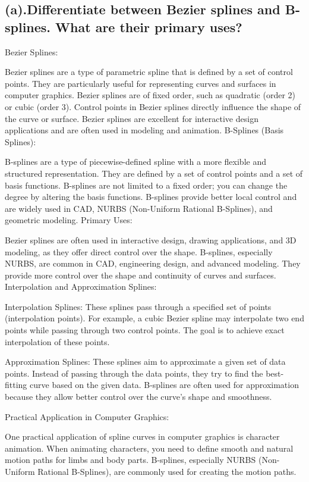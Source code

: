 \documentclass{article}
\begin{document}
\begin{itemize}
\subsection{(a).Differentiate between Bezier splines and B-splines. What are their primary uses?}
Bezier Splines:

Bezier splines are a type of parametric spline that is defined by a set of control points.
They are particularly useful for representing curves and surfaces in computer graphics.
Bezier splines are of fixed order, such as quadratic (order 2) or cubic (order 3).
Control points in Bezier splines directly influence the shape of the curve or surface.
Bezier splines are excellent for interactive design applications and are often used in modeling and animation.
B-Splines (Basis Splines):

B-splines are a type of piecewise-defined spline with a more flexible and structured representation.
They are defined by a set of control points and a set of basis functions.
B-splines are not limited to a fixed order; you can change the degree by altering the basis functions.
B-splines provide better local control and are widely used in CAD, NURBS (Non-Uniform Rational B-Splines), and geometric modeling.
Primary Uses:

Bezier splines are often used in interactive design, drawing applications, and 3D modeling, as they offer direct control over the shape.
B-splines, especially NURBS, are common in CAD, engineering design, and advanced modeling. They provide more control over the shape and continuity of curves and surfaces.
Interpolation and Approximation Splines:

Interpolation Splines: These splines pass through a specified set of points (interpolation points). For example, a cubic Bezier spline may interpolate two end points while passing through two control points. The goal is to achieve exact interpolation of these points.

Approximation Splines: These splines aim to approximate a given set of data points. Instead of passing through the data points, they try to find the best-fitting curve based on the given data. B-splines are often used for approximation because they allow better control over the curve's shape and smoothness.

Practical Application in Computer Graphics:

One practical application of spline curves in computer graphics is character animation. When animating characters, you need to define smooth and natural motion paths for limbs and body parts. B-splines, especially NURBS (Non-Uniform Rational B-Splines), are commonly used for creating the motion paths.


\end{itemize}
\end{document}
